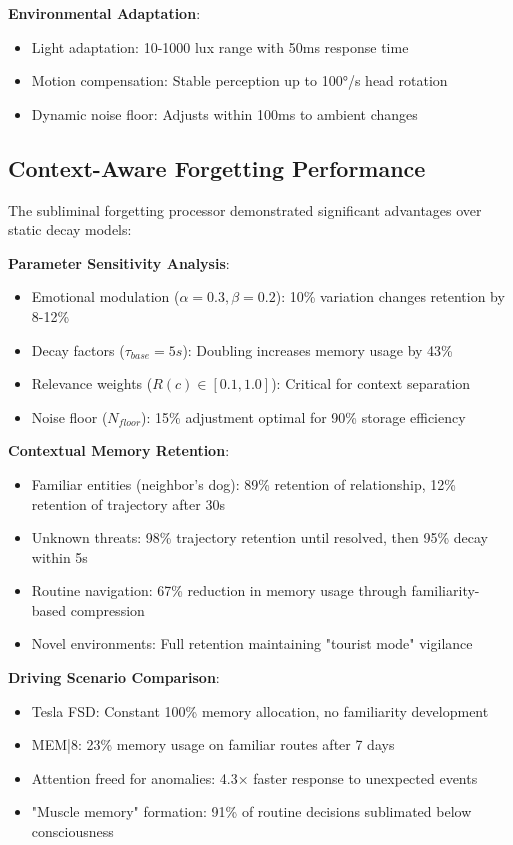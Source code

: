 \documentclass[11pt,letterpaper]{article}
\begin{document}
\textbf{Environmental Adaptation}:
\begin{itemize}
\item Light adaptation: 10-1000 lux range with 50ms response time
\item Motion compensation: Stable perception up to 100°/s head rotation
\item Dynamic noise floor: Adjusts within 100ms to ambient changes
\end{itemize}

\subsection{Context-Aware Forgetting Performance}

The subliminal forgetting processor demonstrated significant advantages over static decay models:

\textbf{Parameter Sensitivity Analysis}:
\begin{itemize}
\item Emotional modulation ($\alpha=0.3, \beta=0.2$): 10\% variation changes retention by 8-12\%
\item Decay factors ($\tau_{base}=5s$): Doubling increases memory usage by 43\%
\item Relevance weights ($R(c) \in [0.1,1.0]$): Critical for context separation
\item Noise floor ($N_{floor}$): 15\% adjustment optimal for 90\% storage efficiency
\end{itemize}

\textbf{Contextual Memory Retention}:
\begin{itemize}
\item Familiar entities (neighbor's dog): 89\% retention of relationship, 12\% retention of trajectory after 30s
\item Unknown threats: 98\% trajectory retention until resolved, then 95\% decay within 5s
\item Routine navigation: 67\% reduction in memory usage through familiarity-based compression
\item Novel environments: Full retention maintaining "tourist mode" vigilance
\end{itemize}

\textbf{Driving Scenario Comparison}:
\begin{itemize}
\item Tesla FSD: Constant 100\% memory allocation, no familiarity development
\item MEM|8: 23\% memory usage on familiar routes after 7 days
\item Attention freed for anomalies: 4.3× faster response to unexpected events
\item "Muscle memory" formation: 91\% of routine decisions sublimated below consciousness
\end{itemize}
\end{document}
